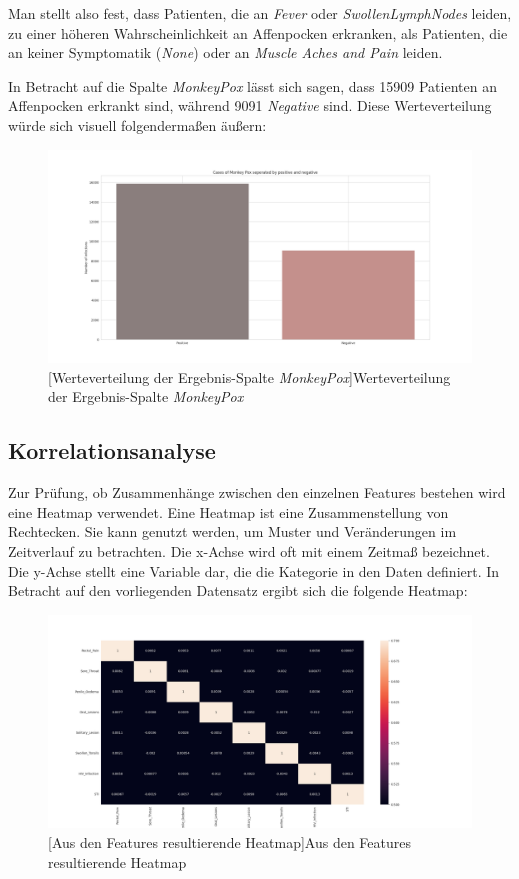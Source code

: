 \documentclass[13pt,a4paper, listof=entryprefix, bibliography=totocnumbered,toc=listofnumbered,lof=listofnumbered]{scrartcl}
\begin{document}
Man stellt also fest, dass Patienten, die an \textit{Fever} oder \textit{Swollen\textunderscore Lymph\textunderscore Nodes} leiden, zu einer
höheren Wahrscheinlichkeit an Affenpocken erkranken, als Patienten, die an keiner Symptomatik (\textit{None}) oder an \textit{Muscle Aches and Pain} leiden.

In Betracht auf die Spalte \textit{MonkeyPox} lässt sich sagen, dass 15909 Patienten an Affenpocken erkrankt sind, während 9091 \textit{Negative} sind.
Diese Werteverteilung würde sich visuell folgendermaßen äußern:

	\begin{figure}[H]
		\centering
		\includegraphics[width=0.8\linewidth]{Bilder/monkey_pox_plot.png}
		[Werteverteilung der Ergebnis-Spalte \textit{MonkeyPox}]{Werteverteilung der Ergebnis-Spalte \textit{MonkeyPox}}
		\label{fig:monkey_pox_plot}
	\end{figure}

	\subsection{Korrelationsanalyse}
		\label{ch:korrleations_analyse}

Zur Prüfung, ob Zusammenhänge zwischen den einzelnen Features bestehen wird eine Heatmap verwendet. 
Eine Heatmap ist eine Zusammenstellung von Rechtecken. Sie kann genutzt werden, um Muster und Veränderungen im
Zeitverlauf zu betrachten. Die x-Achse wird oft mit einem Zeitmaß bezeichnet. Die y-Achse stellt eine Variable dar, 
die die Kategorie in den Daten definiert. In Betracht auf den vorliegenden Datensatz ergibt sich die folgende Heatmap:

	\begin{figure}[H]
		\centering
		\includegraphics[width=0.8\linewidth]{Bilder/heat_map.png}
		[Aus den Features resultierende Heatmap]{Aus den Features resultierende Heatmap}
		\label{fig:heatmap}
	\end{figure}
	
\end{document}
